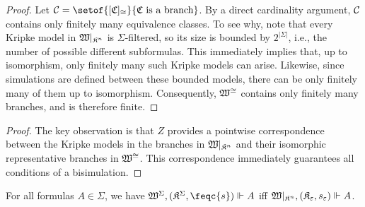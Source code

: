 \begin{proof}
    Let $\branches = \setof{[\bwmodel]_{\cong}}{\bwmodel \text{ is a branch}}$.
    By a direct cardinality argument, $\mathcal{C}$ contains only finitely many equivalence classes.
    To see why, note that every Kripke model in $\mathfrak{W}\vert_{\mathfrak{K}^{n}}$ is $\Sigma$-filtered, so its size is bounded by $2^{|\Sigma|}$, i.e., the number of possible different subformulas. This immediately implies that, up to isomorphism, only finitely many such Kripke models can arise. Likewise, since simulations are defined between these bounded models, there can be only finitely many of them up to isomorphism. Consequently, $\mathfrak{W}^{\cong}$ contains only finitely many branches, and is therefore finite.
\end{proof}

\begin{proof}
	The key observation is that $Z$ provides a pointwise correspondence between the Kripke models in the branches in $\mathfrak{W}\vert_{\mathfrak{K}^{n}}$ and their isomorphic representative branches in $\mathfrak{W}^{\cong}$. This correspondence immediately guarantees all conditions of a bisimulation.
\end{proof}

\begin{corollary}
    For all formulas $A \in \Sigma$, we have $\xforces{\fwmodel}{\pair {\fmodel} {\feqc{s}}}{A}$ iff ${\mathfrak{W}\vert_{\mathfrak{K}^{n}},(\mathfrak{K}_{\varepsilon},s_{\varepsilon})}\Vdash{A}$.
\end{corollary}


